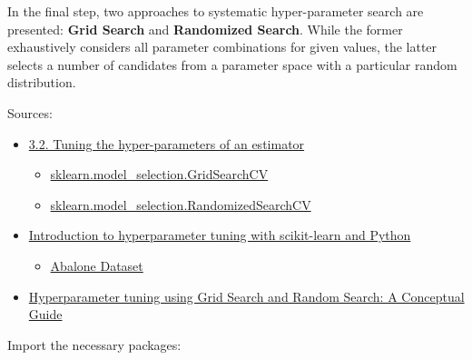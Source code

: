 \documentclass [oneside,10pt,a4paper,ngerman,BCOR10mm,headsepline,parindent,final]{scrartcl}
\providecommand{\tightlist}{%
      \setlength{\itemsep}{0pt}\setlength{\parskip}{0pt}}
\begin{document}
In the final step, two approaches to systematic hyper-parameter search
are presented: \textbf{Grid Search} and \textbf{Randomized Search}.
While the former exhaustively considers all parameter combinations for
given values, the latter selects a number of candidates from a parameter
space with a particular random distribution.

Sources:

\begin{itemize}
\tightlist
\item
  \href{https://scikit-learn.org/stable/modules/grid_search.html}{3.2.
  Tuning the hyper-parameters of an estimator}

  \begin{itemize}
  \tightlist
  \item
    \href{https://scikit-learn.org/stable/modules/generated/sklearn.model_selection.GridSearchCV.html}{sklearn.model\_selection.GridSearchCV}
  \item
    \href{https://scikit-learn.org/stable/modules/generated/sklearn.model_selection.RandomizedSearchCV.html\#sklearn.model_selection.RandomizedSearchCV}{sklearn.model\_selection.RandomizedSearchCV}
  \end{itemize}
\item
  \href{https://pyimagesearch.com/2021/05/17/introduction-to-hyperparameter-tuning-with-scikit-learn-and-python/}{Introduction
  to hyperparameter tuning with scikit-learn and Python}

  \begin{itemize}
  \tightlist
  \item
    \href{https://www.kaggle.com/datasets/rodolfomendes/abalone-dataset?resource=download}{Abalone
    Dataset}
  \end{itemize}
\item
  \href{https://medium.com/@jackstalfort/hyperparameter-tuning-using-grid-search-and-random-search-f8750a464b35}{Hyperparameter
  tuning using Grid Search and Random Search: A Conceptual Guide}
\end{itemize}

    Import the necessary packages:
\end{document}
